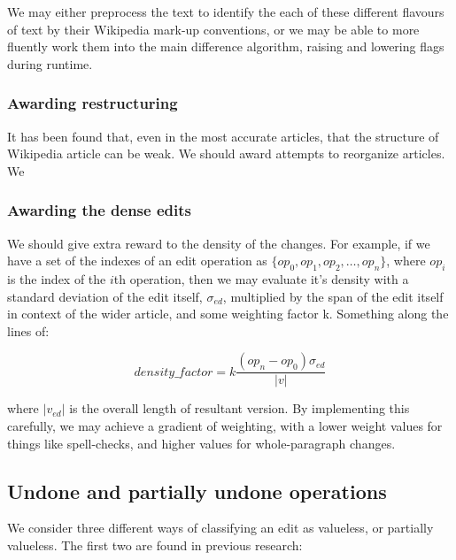 \documentclass[a4paper,11pt,twoside,notitlepage]{article}
\begin{document}
        We may either preprocess the text to identify the each of
        these different flavours of text by their Wikipedia mark-up
        conventions, or we may be able to more fluently work them into
        the main difference algorithm, raising and lowering flags
        during runtime.

        \subsubsection*{Awarding restructuring}
        It has been found that, even in the most accurate articles,
        that the structure of Wikipedia article can be
        weak.\cite{Giles2005} We should award attempts to reorganize
        articles. We 
        
        \subsubsection*{Awarding the dense edits}
        We should give extra reward to the density of the
        changes. For example, if we have a set of the indexes of an
        edit operation as $\{op_0,op_1,op_2,\dots, op_n\}$, where
        $op_i$ is the index of the $i$th operation, then we may
        evaluate it's density with a standard deviation of the edit
        itself, $\sigma_{ed}$, multiplied by the span of the edit
        itself in context of the wider article, and some weighting
        factor k. Something along the lines of:

        $$density\_factor = k\frac{(op_n - op_0)\sigma_{ed}}{|v|}$$ 

        where $|v_{ed}|$ is the overall length of resultant version. By
        implementing this carefully, we may achieve a gradient of
        weighting, with a lower weight values for things like
        spell-checks, and higher values for whole-paragraph changes.

        \subsection*{Undone and partially undone operations}
        We consider three different ways of classifying an edit as
        valueless, or partially valueless. The first two are found in
        previous research:
\end{document}
